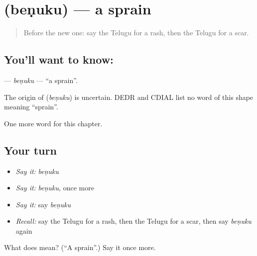 \section[\texorpdfstring{\te{బెణుకు} (beṇuku)}{బెణుకు (beṇuku)}]{ (beṇuku) — a sprain}

\label{lesson:TE-C169-benuku}



\begin{quote}
Before the new one: say the Telugu for a rash, then the Telugu for a scar.
\end{quote}

\subsection*{You'll want to know: }
\textbf{} — \emph{beṇuku} — \textquotedblleft{}a sprain\textquotedblright{}.

\begin{cousinweb}
The origin of \textbf{} (\emph{beṇuku}) is uncertain. DEDR and CDIAL list no word of this shape meaning \textquotedblleft{}sprain\textquotedblright{}.
\end{cousinweb}

\begin{grammarlens}[title={What you've built}]
One more word for this chapter.
\end{grammarlens}

\subsection*{Your turn}
\begin{itemize}
\raggedright
  \item \emph{Say it:} \emph{beṇuku}
  \item \emph{Say it:} \emph{beṇuku}, once more
  \item \emph{Say it:} say \emph{beṇuku}
  \item \emph{Recall:} say the Telugu for a rash, then the Telugu for a scar, then say \emph{beṇuku} again
\end{itemize}

\begin{tcolorbox}[breakable,colback=teal!4,colframe=teal!35!black,title={Before you move on}]
What does  mean? (\textquotedblleft{}A sprain\textquotedblright{}.) Say it once more.
\end{tcolorbox}
